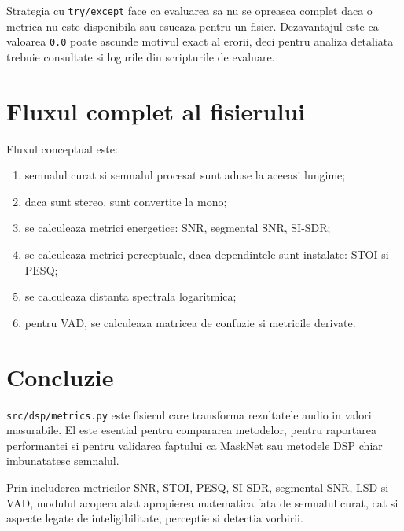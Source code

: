 \documentclass[12pt,a4paper]{report}
\begin{document}
Strategia cu \texttt{try/except} face ca evaluarea sa nu se opreasca complet daca o metrica nu este disponibila sau esueaza pentru un fisier. Dezavantajul este ca valoarea \texttt{0.0} poate ascunde motivul exact al erorii, deci pentru analiza detaliata trebuie consultate si logurile din scripturile de evaluare.

\chapter{Fluxul complet al fisierului}

Fluxul conceptual este:

\begin{enumerate}
    \item semnalul curat si semnalul procesat sunt aduse la aceeasi lungime;
    \item daca sunt stereo, sunt convertite la mono;
    \item se calculeaza metrici energetice: SNR, segmental SNR, SI-SDR;
    \item se calculeaza metrici perceptuale, daca dependintele sunt instalate: STOI si PESQ;
    \item se calculeaza distanta spectrala logaritmica;
    \item pentru VAD, se calculeaza matricea de confuzie si metricile derivate.
\end{enumerate}

\chapter{Concluzie}

\texttt{src/dsp/metrics.py} este fisierul care transforma rezultatele audio in valori masurabile. El este esential pentru compararea metodelor, pentru raportarea performantei si pentru validarea faptului ca MaskNet sau metodele DSP chiar imbunatatesc semnalul.

Prin includerea metricilor SNR, STOI, PESQ, SI-SDR, segmental SNR, LSD si VAD, modulul acopera atat apropierea matematica fata de semnalul curat, cat si aspecte legate de inteligibilitate, perceptie si detectia vorbirii.
\end{document}
